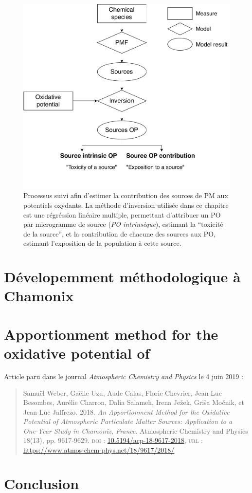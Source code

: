 \begin{figure}[ht]
    \centering
    \includegraphics[width=0.8\linewidth]{figures/chapter04/flowchart_inversion.pdf}
    \caption{Processus suivi afin d'estimer la contribution des sources de PM aux
        potentiels oxydants. La méthode d'inversion utilisée dans ce chapitre est une
        régréssion linéaire multiple, permettant d'attribuer un PO par microgramme de source
        (\textit{PO intrinsèque}), estimant la ``toxicité de la source'', et la contribution de
    chacune des sources aux PO, estimant l'exposition de la population à cette source.}%
    \label{fig:workflow_inversion}
\end{figure}

\section{Dévelopemment méthodologique à Chamonix}%
\label{sec:dévelopemment_méthodologique_à_chamonix}

\clearpage
\section{Apportionment method for the oxidative potential of \PMdix{}}
\label{sec:weber_et_al_2018}

Article paru dans le journal \textit{Atmospheric Chemistry and Physics} le 4 juin 2019 :

\begin{quote}
    Samuël Weber, Gaëlle Uzu, Aude Calas, Florie Chevrier, Jean-Luc Besombes,
    Aurélie Charron, Dalia Salameh, Irena Ježek, Griša Močnik, et Jean-Luc Jaffrezo. 2018.
    \textit{An Apportionment Method for the Oxidative Potential of Atmospheric Particulate
    Matter Sources: Application to a One-Year Study in Chamonix, France}. Atmospheric
    Chemistry and Physics 18(13), pp. 9617‑9629.
    \textsc{doi} : \href{https://doi.org/10.5194/acp-18-9617-2018}{10.5194/acp-18-9617-2018},
    \textsc{url} : \url{https://www.atmos-chem-phys.net/18/9617/2018/}
\end{quote}




\section{Conclusion}
